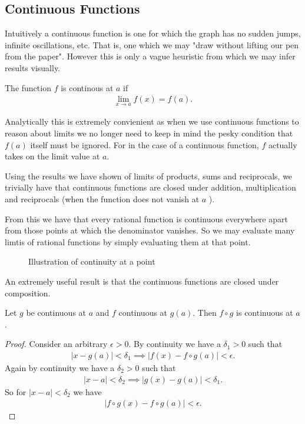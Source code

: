 \documentclass[]{article}
\begin{document}
\subsection{Continuous Functions}

Intuitively a continuous function is one for which the graph has no sudden jumps, infinite oscillations, etc. That is, one which we may "draw without lifting our pen from the paper". However this is only a vague heuristic from which we may infer results visually. 

\begin{defi} 
	The function $f$ is continous at $a$ if 
	\begin{align*}
			\lim_{x \to a} f(x) = f(a).
	\end{align*}
\end{defi}

Analytically this is extremely convienient as when we use continuous functions to reason about limits we no longer need to keep in mind the pesky condition that $f(a)$ itself must be ignored. For in the case of a continuous function, $f$ actually takes on the limit value at $a$.

Using the results we have shown of limits of products, sums and reciprocals, we trivially have that continuous functions are closed under addition, multiplication and reciprocals (when the function does not vanish at $a$ ). 

From this we have that every rational function is continuous everywhere apart from those points at which the denominator vanishes. So we may evaluate many limtis of rational functions by simply evaluating them at that point.

\begin{figure}[ht]
\centering
{}
\caption{Illustration of continuity at a point}
\label{fig:continuity}
\end{figure}

An extremely useful result is that the continuous functions are closed under composition. 

\begin{thm} 
		Let $g$ be continuous at $a$ and $f$ continuous at $g(a)$. Then $f \circ g$ is continuous at $a$.
\end{thm}

\begin{proof}
	Consider an arbitrary $\epsilon > 0$. By continuity we have a $\delta_1 > 0$ such that 
	\begin{align*}
			|x - g(a)| < \delta_1 \implies |f(x) - f\circ g(a)| < \epsilon.
	\end{align*}
	Again by continuity we have a $\delta_2 > 0$ such that 
	\begin{align*}
			|x-a| < \delta_2 \implies |g(x) - g(a)| < \delta_1.
	\end{align*}
	So for $|x - a| < \delta_2$ we have
	\begin{align*}
			|f \circ g(x) - f \circ g(a)| < \epsilon.
	\end{align*}
\end{proof}
\end{document}
